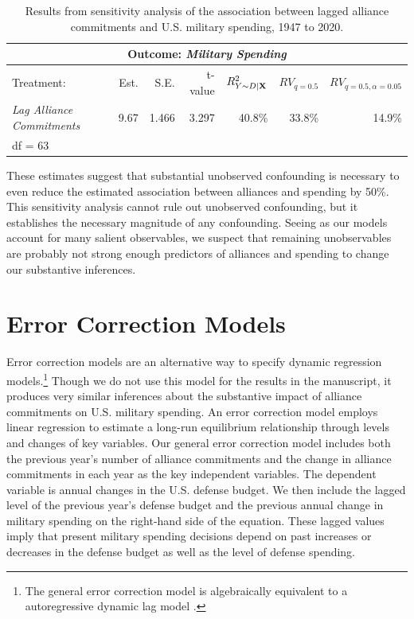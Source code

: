 \documentclass[12pt]{article}
\begin{document}
\begin{table}[!h]
\centering
\begin{tabular}{lrrrrrr}
\multicolumn{7}{c}{Outcome: \textit{Military Spending}} \\
\hline \hline 
Treatment: & Est. & S.E. & t-value & $R^2_{Y \sim D |{\bf X}}$ & $RV_{q = 0.5}$ & $RV_{q = 0.5, \alpha = 0.05}$  \\ 
\hline 
\textit{Lag Alliance Commitments} & 9.67 & 1.466 & 3.297 & 40.8\% & 33.8\% & 14.9\% \\ 
\hline 
df = 63 & & \\%
\end{tabular}
\caption{Results from sensitivity analysis of the association between lagged alliance commitments and U.S. military spending, 1947 to 2020.}
\label{tab:sensitivity-res}
\end{table}


These estimates suggest that substantial unobserved confounding is necessary to even reduce the estimated association between alliances and spending by 50\%. 
This sensitivity analysis cannot rule out unobserved confounding, but it establishes the necessary magnitude of any confounding. 
Seeing as our models account for many salient observables, we suspect that remaining unobservables are probably not strong enough predictors of alliances and spending to change our substantive inferences.



\section{Error Correction Models} 


Error correction models are an alternative way to specify dynamic regression models.\footnote{The general error correction model is algebraically equivalent to a autoregressive dynamic lag model \citep{DeBoefKeele2008}.}
Though we do not use this model for the results in the manuscript, it produces very similar inferences about the substantive impact of alliance commitments on U.S. military spending. 
An error correction model employs linear regression to estimate a long-run equilibrium relationship through levels and changes of key variables.
Our general error correction model includes both the previous year's number of alliance commitments and the change in alliance commitments in each year as the key independent variables. 
The dependent variable is annual changes in the U.S. defense budget.
We then include the lagged level of the previous year's defense budget and the previous annual change in military spending on the right-hand side of the equation.
These lagged values imply that present military spending decisions depend on past increases or decreases in the defense budget as well as the level of defense spending.
\end{document}
